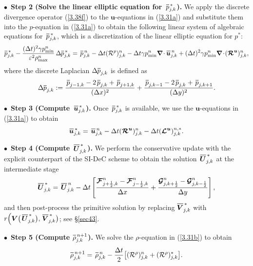 \documentclass[A4paper,12pt,twoside]{article}
\numberwithin{equation}{section}
\numberwithin{figure}{section}
\numberwithin{table}{section}
\def\bnabla{\bm{\nabla}}
\newcommand{\dt}{\Delta t}
\newcommand{\dx}{\Delta x}
\newcommand{\dy}{\Delta y}
\newcommand{\kph}{{k+\frac{1}{2}}}
\newcommand{\kmh}{{k-\frac{1}{2}}}
\newcommand{\jph}{{j+\frac{1}{2}}}
\newcommand{\jmh}{{j-\frac{1}{2}}}
\newcommand{\ve}{\varepsilon}
\newcommand\eref[1]{(\ref{#1})}
\newcommand*\xbar[1]{%
  \hbox{%
    \vbox{%
      \hrule height 0.5pt %
      \kern0.4ex%
      \hbox{%
        \kern-0.05em%
        \ensuremath{#1}%
        \kern-0.00em%
      }%
    }%
  }%
}
\begin{document}
\smallskip
\noindent
$\bullet\,$ \textbf{Step 2 (Solve the linear elliptic equation for $\,\xbar p^{\,*}_{j,k}$).} We apply the discrete divergence operator
\eref{3.38f} to the $\bm u$-equations  in \eref{3.31a} and substitute them into the $p$-equation in \eref{3.31a} to obtain the following
linear system of algebraic equations for $\,\xbar p^{\,*}_{j,k}$, which is a discretization of the linear elliptic equation for $p^*$:
\begin{equation*}
\xbar p^{\,*}_{j,k}-\frac{(\dt)^2\gamma p_{\min}^n}{\ve^2\rho_{\max}^n}\,\Delta\xbar p_{j,k}^{\,*}=\,\xbar p^{\,n}_{j,k}-
\dt({\cal R}^p)^n_{j,k}-\dt\gamma p_{\min}^n\bnabla\!\cdot\xbar{\bm u}_{j,k}^{\,n}
+(\dt)^2\gamma p_{\min}^n\bnabla\!\cdot\!(\bm{{\cal R}}^{\bm u})^n_{j,k},
\label{3.39f}
\end{equation*}
where the discrete Laplacian $\Delta\xbar p_{j,k}$ is defined as
$$
\Delta\xbar p_{j,k}:=\frac{\,\xbar p_{j-1,k}-2\,\xbar p_{j,k}+\,\xbar p_{j+1,k}}{(\dx)^2}+
\frac{\,\xbar p_{j,k-1}-2\,\xbar p_{j,k}+\,\xbar p_{j,k+1}}{(\dy)^2}.
$$

\smallskip
\noindent
$\bullet\,$ \textbf{Step 3 (Compute $\,\xbar{\bm u}^{\,*}_{j,k}$).} Once $\,\xbar p^{\,*}_{j,k}$ is available, we use the $\bm u$-equations
in \eref{3.31a} to obtain
\begin{equation*}
\xbar{\bm u}^{\,*}_{j,k}=\,\xbar{\bm u}^{\,n}_{j,k}-\dt(\bm{{\cal R}}^{\bm u})^n_{j,k}-\dt(\bm{{\cal L}}^{\bm u})^{n,*}_{j,k}.
\end{equation*}

\smallskip
\noindent
$\bullet\,$ \textbf{Step 4 (Compute $\,\xbar{\bm U}^{\,*}_{j,k}$).} 
We perform the conservative update with the explicit counterpart of the SI-DeC scheme to obtain the solution $\,\xbar{\bm U}^{\,*}_{j,k}$ 
at the intermediate stage
\begin{equation}
\xbar{\bm U}^{\,*}_{j,k}=\,\xbar{\bm U}^{\,n}_{j,k}-\dt\left[\frac{\bm{{\cal F}}_{\jph,k}^n-\bm{{\cal F}}_{\jmh,k}^n}{\dx}+
\frac{\bm{{\cal G}}_{j,\kph}^n-\bm{{\cal G}}_{j,\kmh}^n}{\dy}\right],
\label{3.50}
\end{equation}
and then post-process the primitive solution by replacing $\xbar{\bm V}^{\,*}_{j,k}$ with
$r\Big(\bm V\big(\,\xbar{\bm U}^{\,*}_{j,k}\big),\,\xbar{\bm V}^{\,*}_{j,k}\big)$; see \S\ref{sec43}.

\smallskip
\noindent
$\bullet\,$ \textbf{Step 5 (Compute $\xbar\rho^{\,n+1}_{j,k}$).} We solve the $\rho$-equation in \eref{3.31b} to obtain
\begin{equation*}
\xbar\rho^{\,n+1}_{j,k}=\,\xbar\rho^{\,n}_{j,k}-\frac{\dt}{2}\big[({\cal R}^\rho)^n_{j,k}+({\cal R}^\rho)^*_{j,k}\big].
\end{equation*}
\end{document}
